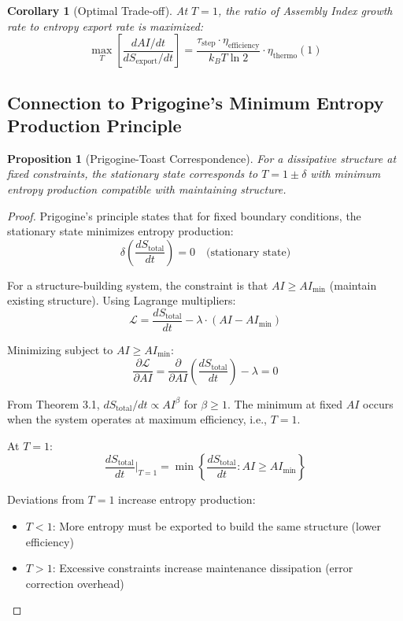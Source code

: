 \documentclass[11pt,a4paper]{article}
\newtheorem{proposition}[theorem]{Proposition}
\newtheorem{corollary}[theorem]{Corollary}
\begin{document}
\begin{corollary}[Optimal Trade-off]
At $T = 1$, the ratio of Assembly Index growth rate to entropy export rate is maximized:
\begin{equation}
\max_T \left[\frac{dAI/dt}{dS_{\text{export}}/dt}\right] = \frac{\tau_{\text{step}} \cdot \eta_{\text{efficiency}}}{k_B T \ln 2} \cdot \eta_{\text{thermo}}(1)
\end{equation}
\end{corollary}

\subsection{Connection to Prigogine's Minimum Entropy Production Principle}

\begin{proposition}[Prigogine-Toast Correspondence]
For a dissipative structure at fixed constraints, the stationary state corresponds to $T = 1 \pm \delta$ with minimum entropy production compatible with maintaining structure.
\end{proposition}

\begin{proof}
Prigogine's principle states that for fixed boundary conditions, the stationary state minimizes entropy production:
\begin{equation}
\delta \left(\frac{dS_{\text{total}}}{dt}\right) = 0 \quad \text{(stationary state)}
\end{equation}

For a structure-building system, the constraint is that $AI \geq AI_{\min}$ (maintain existing structure). Using Lagrange multipliers:
\begin{equation}
\mathcal{L} = \frac{dS_{\text{total}}}{dt} - \lambda \cdot (AI - AI_{\min})
\end{equation}

Minimizing subject to $AI \geq AI_{\min}$:
\begin{equation}
\frac{\partial \mathcal{L}}{\partial AI} = \frac{\partial}{\partial AI}\left(\frac{dS_{\text{total}}}{dt}\right) - \lambda = 0
\end{equation}

From Theorem 3.1, $dS_{\text{total}}/dt \propto AI^{\beta}$ for $\beta \geq 1$. The minimum at fixed $AI$ occurs when the system operates at maximum efficiency, i.e., $T = 1$.

At $T = 1$:
\begin{equation}
\frac{dS_{\text{total}}}{dt}\bigg|_{T=1} = \min \left\{\frac{dS_{\text{total}}}{dt} : AI \geq AI_{\min}\right\}
\end{equation}

Deviations from $T = 1$ increase entropy production:
\begin{itemize}
\item $T < 1$: More entropy must be exported to build the same structure (lower efficiency)
\item $T > 1$: Excessive constraints increase maintenance dissipation (error correction overhead)
\end{itemize}
\end{proof}
\end{document}
